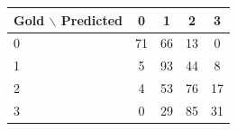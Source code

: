 \begin{tabular}{lcccc}
\toprule
Gold $\backslash$ Predicted & 0 & 1 & 2 & 3 \\
\midrule
0 & 71 & 66 & 13 & 0 \\
1 & 5 & 93 & 44 & 8 \\
2 & 4 & 53 & 76 & 17 \\
3 & 0 & 29 & 85 & 31 \\
\bottomrule
\end{tabular}
